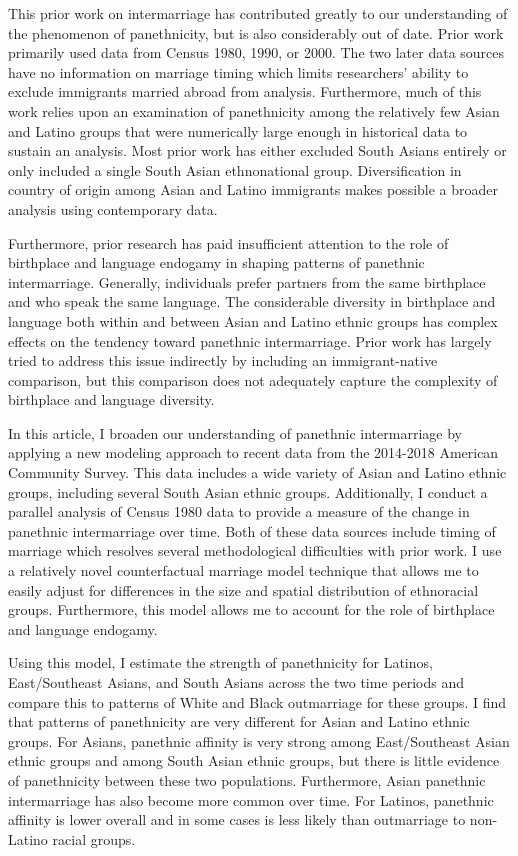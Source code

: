 \documentclass[11pt,]{article}
\begin{document}
This prior work on intermarriage has contributed greatly to our understanding of the phenomenon of panethnicity, but is also considerably out of date. Prior work primarily used data from Census 1980, 1990, or 2000. The two later data sources have no information on marriage timing which limits researchers' ability to exclude immigrants married abroad from analysis. Furthermore, much of this work relies upon an examination of panethnicity among the relatively few Asian and Latino groups that were numerically large enough in historical data to sustain an analysis. Most prior work has either excluded South Asians entirely or only included a single South Asian ethnonational group. Diversification in country of origin among Asian and Latino immigrants makes possible a broader analysis using contemporary data.

Furthermore, prior research has paid insufficient attention to the role of birthplace and language endogamy in shaping patterns of panethnic intermarriage. Generally, individuals prefer partners from the same birthplace and who speak the same language. The considerable diversity in birthplace and language both within and between Asian and Latino ethnic groups has complex effects on the tendency toward panethnic intermarriage. Prior work has largely tried to address this issue indirectly by including an immigrant-native comparison, but this comparison does not adequately capture the complexity of birthplace and language diversity.

In this article, I broaden our understanding of panethnic intermarriage by applying a new modeling approach to recent data from the 2014-2018 American Community Survey. This data includes a wide variety of Asian and Latino ethnic groups, including several South Asian ethnic groups. Additionally, I conduct a parallel analysis of Census 1980 data to provide a measure of the change in panethnic intermarriage over time. Both of these data sources include timing of marriage which resolves several methodological difficulties with prior work. I use a relatively novel counterfactual marriage model technique \citep{gullickson_counterfactual_2021} that allows me to easily adjust for differences in the size and spatial distribution of ethnoracial groups. Furthermore, this model allows me to account for the role of birthplace and language endogamy.

Using this model, I estimate the strength of panethnicity for Latinos, East/Southeast Asians, and South Asians across the two time periods and compare this to patterns of White and Black outmarriage for these groups. I find that patterns of panethnicity are very different for Asian and Latino ethnic groups. For Asians, panethnic affinity is very strong among East/Southeast Asian ethnic groups and among South Asian ethnic groups, but there is little evidence of panethnicity between these two populations. Furthermore, Asian panethnic intermarriage has also become more common over time. For Latinos, panethnic affinity is lower overall and in some cases is less likely than outmarriage to non-Latino racial groups.
\end{document}
